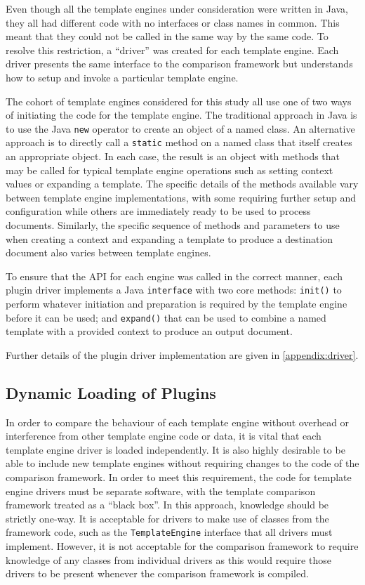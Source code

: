 Even though all the \gls{template engine}s under consideration were written in Java, they all had different code with no interfaces or class names in common. This meant that they could not be called in the same way by the same code. To resolve this restriction, a \enquote{driver} was created for each \gls{template engine}. Each driver presents the same interface to the comparison framework but understands how to setup and invoke a particular \gls{template engine}.

The cohort of \gls{template engine}s considered for this study all use one of two ways of initiating the code for the \gls{template engine}. The traditional approach in Java is to use the Java \verb!new! operator to create an object of a named class. An alternative approach is to directly call a \verb!static! method on a named class that itself creates an appropriate object. In each case, the result is an object with methods that may be called for typical \gls{template engine} operations such as setting context values or expanding a template. The specific details of the methods available vary between \gls{template engine} implementations, with some requiring further setup and configuration while others are immediately ready to be used to process documents. Similarly, the specific sequence of methods and parameters to use when creating a context and expanding a template to produce a destination document also varies between \gls{template engine}s.

To ensure that the API for each engine was called in the correct manner, each plugin driver implements a Java \verb!interface! with two core methods: \verb!init()! to perform whatever initiation and preparation is required by the \gls{template engine} before it can be used; and \verb!expand()! that can be used to combine a named template with a provided context to produce an output document. 

Further details of the plugin driver implementation are given in \cref{appendix:driver}.

\subsection{Dynamic Loading of Plugins}
\label{comp:plugins:dynamic}

In order to compare the behaviour of each \gls{template engine} without overhead or interference from other \gls{template engine} code or data, it is vital that each \gls{template engine} driver is loaded independently. It is also highly desirable to be able to include new \gls{template engine}s without requiring changes to the code of the comparison framework. In order to meet this requirement, the code for \gls{template engine} drivers must be separate software, with the template comparison framework treated as a \enquote{black box}. In this approach, knowledge should be strictly one-way. It is acceptable for drivers to make use of classes from the framework code, such as the \verb!TemplateEngine! interface that all drivers must implement. However, it is not acceptable for the comparison framework to require knowledge of any classes from individual drivers as this would require those drivers to be present whenever the comparison framework is compiled.

